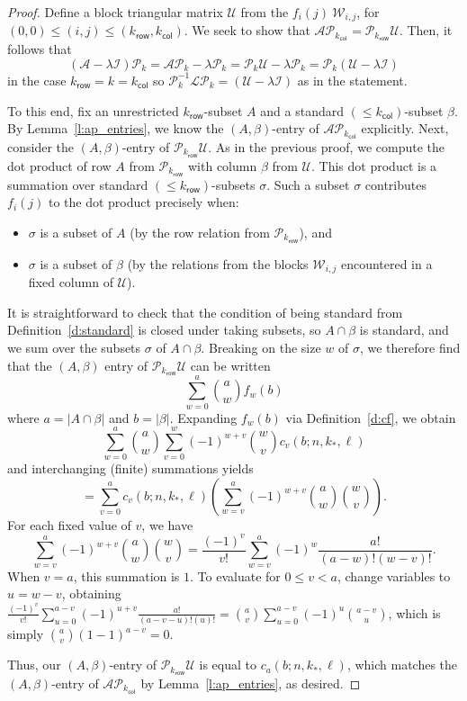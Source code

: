 \documentclass[11pt]{article}
\theoremstyle{definition}
\numberwithin{equation}{section}
\numberwithin{equation}{section}
\renewcommand{\L}{\mathcal{L}}
\renewcommand{\P}{\mathcal{P}}
\newcommand{\I}{\mathcal{I}}
\newcommand{\W}{\mathcal{W}}
\newcommand{\U}{\mathcal{U}}
\newcommand{\A}{\mathcal{A}}
\newcommand{\kr}{{k}_{\mathsf{row}}}
\newcommand{\kc}{{k}_{\mathsf{col}}}
\newcommand{\kk}{{k}_{\mathsf{*}}}
\begin{document}
\begin{proof}
Define a block triangular matrix $\U$ from the $f_i(j) \ \W_{i,j}$, for $(0, 0) \leq (i, j) \leq (\kr, \kc)$.  We 
seek to show that $\A \P_{\kc} = \P_{\kr} \U$.  Then, it follows that 
\[ (\A - \lambda \I) \P_k = \A \P_k - \lambda \P_k = \P_k \U - \lambda \P_k = \P_k (\U - \lambda \I) \]
in the case $\kr = k = \kc$ so $\P_k^{-1} \L \P_k = (\U - \lambda \I)$ as in the statement.

To this end, fix an unrestricted $\kr$-subset $A$ and a standard $(\leq \kc)$-subset $\beta$.
By Lemma~\ref{l:ap_entries}, we know the $(A, \beta)$-entry of $\A \P_{\kc}$
explicitly.  Next, consider the $(A, \beta)$-entry of $\P_{\kr} \U$.
As in the previous proof, we compute the dot product of row $A$ from $\P_{\kr}$ with column $\beta$ from $\U$.  This dot product is a summation over standard $(\leq \kr)$-subsets $\sigma$.  Such a subset $\sigma$ contributes $f_i(j)$ to the dot product precisely when:
\begin{itemize}
    \item $\sigma$ is a subset of $A$ (by the row relation from $\P_{\kr}$), and
    \item $\sigma$ is a subset of $\beta$ (by the relations from the blocks $\W_{i,j}$ encountered in a fixed column of $\U$).
\end{itemize}

It is straightforward to check that the condition of being standard from Definition~\ref{d:standard} is closed under taking subsets, so $A \cap \beta$ is standard, and we sum over the subsets $\sigma$ of $A \cap \beta$.  Breaking on the size $w$ of $\sigma$, we therefore find that the $(A, \beta)$ entry of $\P_{\kr} \U$ can be written 
\[ \sum_{w = 0}^a \binom{a}{w} f_w(b) \]
where $a = |A \cap \beta|$ and $b = |\beta|$.  Expanding $f_w(b)$ via Definition~\ref{d:cf}, we obtain
\[ \sum_{w = 0}^a \binom{a}{w} \sum_{v=0}^w (-1)^{w+v} \binom{w}{v} c_v(b; n, \kk, \ell) \]
and interchanging (finite) summations yields
\[ = \sum_{v = 0}^a c_v(b; n, \kk, \ell) \left(\sum_{w=v}^a (-1)^{w+v} \binom{a}{w}  \binom{w}{v}\right). \]
For each fixed value of $v$, we have
\[\sum_{w=v}^a (-1)^{w+v} \binom{a}{w}  \binom{w}{v} = \frac{(-1)^v}{v!} \sum_{w = v}^a (-1)^{w} \frac{a!}{(a-w)!(w-v)!}.\]
When $v = a$, this summation is $1$.  To evaluate for $0 \leq v < a$, change variables to $u = w-v$, obtaining
$\frac{(-1)^v}{v!} \sum_{u = 0}^{a-v} (-1)^{u+v} \frac{a!}{(a-v-u)!(u)!} = \binom{a}{v} \sum_{u = 0}^{a-v} (-1)^{u} \binom{a-v}{u}$,
which is simply $\binom{a}{v} (1-1)^{a-v} = 0$.

Thus, our $(A,\beta)$-entry of $\P_{\kr}\U$ is equal to $c_a(b; n, \kk, \ell)$, which matches the $(A, \beta)$-entry of $\A\P_{\kc}$ by Lemma~\ref{l:ap_entries}, as desired.
\end{proof}
\end{document}
